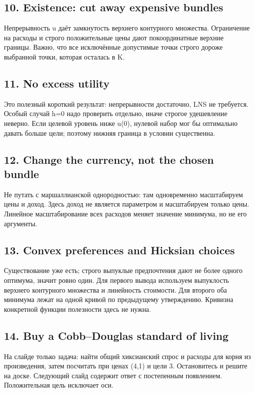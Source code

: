 \documentclass[11pt,a4paper]{article}
\begin{document}
\subsection*{10. Existence: cut away expensive bundles}
Непрерывность u даёт замкнутость верхнего контурного множества. Ограничение на расходы и строго положительные цены дают покоординатные верхние границы. Важно, что все исключённые допустимые точки строго дороже выбранной точки, которая осталась в K.

\subsection*{11. No excess utility}
Это полезный короткий результат: непрерывности достаточно, LNS не требуется. Особый случай h=0 надо проверить отдельно, иначе строгое удешевление неверно. Если целевой уровень ниже u(0), нулевой набор мог бы оптимально давать больше цели; поэтому нижняя граница в условии существенна.

\subsection*{12. Change the currency, not the chosen bundle}
Не путать с маршаллианской однородностью: там одновременно масштабируем цены и доход. Здесь доход не является параметром и масштабируем только цены. Линейное масштабирование всех расходов меняет значение минимума, но не его аргументы.

\subsection*{13. Convex preferences and Hicksian choices}
Существование уже есть; строго выпуклые предпочтения дают не более одного оптимума, значит ровно один. Для первого вывода используем выпуклость верхнего контурного множества и линейность стоимости. Для второго оба минимума лежат на одной кривой по предыдущему утверждению. Кривизна конкретной функции полезности здесь не нужна.

\subsection*{14. Buy a Cobb--Douglas standard of living}
На слайде только задача: найти общий хиксианский спрос и расходы для корня из произведения, затем посчитать при ценах (4,1) и цели 3. Остановитесь и решите на доске. Следующий слайд содержит ответ с постепенным появлением. Положительная цель исключает оси.
\end{document}
